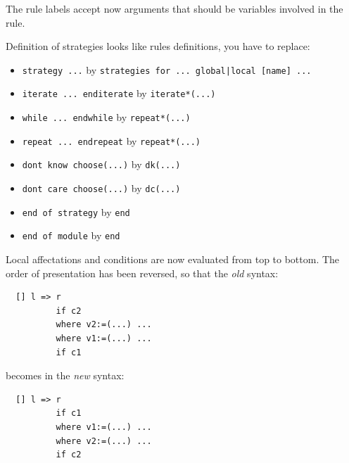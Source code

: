 The rule labels accept now arguments that should be variables involved
in the rule.

Definition of strategies looks like rules definitions, you have to
replace: 
\begin{itemize}
\item \texttt{strategy ...} by \texttt{strategies for ... global|local
    [name] ...} 
\item \texttt{iterate ... enditerate} by \texttt{iterate*(...)}
\item \texttt{while ... endwhile} by \texttt{repeat*(...)}
\item \texttt{repeat ... endrepeat} by \texttt{repeat*(...)}
\item \texttt{dont know choose(...)} by \texttt{dk(...)}
\item \texttt{dont care choose(...)} by \texttt{dc(...)}
\item \texttt{end of strategy} by \texttt{end}
\item \texttt{end of module} by \texttt{end}
\end{itemize}
Local affectations and conditions are now evaluated from top to
bottom. The order of presentation has been reversed, so that the {\em
old} syntax:
\begin{verbatim}
  [] l => r
          if c2
          where v2:=(...) ...
          where v1:=(...) ...
          if c1
\end{verbatim}
becomes in the {\em new} syntax:
\begin{verbatim}
  [] l => r
          if c1
          where v1:=(...) ...
          where v2:=(...) ...
          if c2
\end{verbatim}

